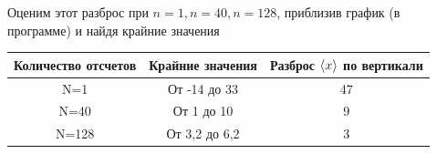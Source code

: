\begin{enumerate}
Оценим этот разброс при $n=1, n=40, n=128$, приблизив график (в программе) и найдя крайние значения
\begin{table}[htbp]
	\centering
	\begin{tabular}{|c|c|c|}
		\toprule
		\textbf{Количество отсчетов} & \textbf{Крайние значения} & \multicolumn{1}{c|}{\textbf{Разброс $\langle x\rangle$ по вертикали}} \\
		\midrule
		N=1   & От -14 до 33 & 47 \\
		\midrule
		N=40  & От 1 до 10 & 9 \\
		\midrule
		N=128 & От 3,2 до 6,2 & 3 \\
		\bottomrule
	\end{tabular}%
	\label{tab:addlabel}%
\end{table}%
\end{enumerate}

